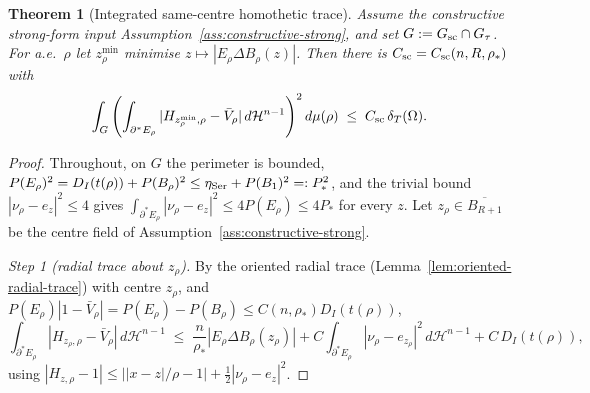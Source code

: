 \documentclass[11pt]{amsart}
\newtheorem{theorem}{Theorem}[section]
\theoremstyle{definition}
\newcommand{\Om}{\Omega}
\newcommand{\dT}{\delta_T}
\newcommand{\rstar}{\rho_*}
\newcommand{\Hn}{\mathcal H^{n-1}}
\newcommand{\Per}{P}
\begin{document}
\begin{theorem}[Integrated same-centre homothetic trace]
\label{inp:samecenter}
Assume the constructive strong-form input
Assumption~\ref{ass:constructive-strong}, and set \(G:=G_{\rm sc}\cap G_\tau\).
For a.e.\ \(\rho\) let \(z_\rho^{\min}\) minimise
\(z\mapsto|E_\rho\Delta B_\rho(z)|\).  Then there is
\(C_{\rm sc}=C_{\rm sc}(n,R,\rstar)\) with
\begin{equation}\label{eq:sc-input}
   \int_{G}
   \left(
      \int_{\partial^*E_\rho}
         |H_{z_\rho^{\min},\rho}-\bar V_\rho|\,d\Hn
   \right)^2 d\mu(\rho)
   \;\le\; C_{\rm sc}\,\dT(\Om).
\end{equation}
\end{theorem}

\begin{proof}
Throughout, on \(G\) the perimeter is bounded, \(\Per(E_\rho)^2=
D_I(t(\rho))+\Per(B_\rho)^2\le\eta_{\rm Ser}+\Per(B_1)^2=:P_*^2\), and the
trivial bound \(|\nu_\rho-e_z|^2\le4\) gives
\(\int_{\partial^*E_\rho}|\nu_\rho-e_z|^2\le4\Per(E_\rho)\le4P_*\) for every
\(z\).  Let \(z_\rho\in\overline{B_{R+1}}\) be the centre field of
Assumption~\ref{ass:constructive-strong}.

\smallskip\noindent\emph{Step 1 (radial trace about \(z_\rho\)).}
By the oriented radial trace (Lemma~\ref{lem:oriented-radial-trace}) with
centre \(z_\rho\), and \(\Per(E_\rho)|1-\bar V_\rho|=\Per(E_\rho)-\Per(B_\rho)
\le C(n,\rstar)D_I(t(\rho))\),
\begin{equation}\label{eq:trace-zrho}
   \int_{\partial^*E_\rho}|H_{z_\rho,\rho}-\bar V_\rho|\,d\Hn
   \;\le\;
   \frac{n}{\rstar}|E_\rho\Delta B_\rho(z_\rho)|
   +C\!\int_{\partial^*E_\rho}|\nu_\rho-e_{z_\rho}|^2\,d\Hn
   +C\,D_I(t(\rho)),
\end{equation}
using \(|H_{z,\rho}-1|\le||x-z|/\rho-1|+\tfrac12|\nu_\rho-e_z|^2\).


\end{proof}
\end{document}
